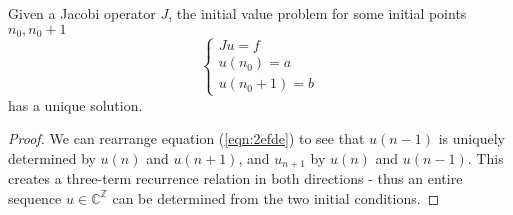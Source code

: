 \documentclass[../main.tex]{subfiles}
\begin{document}
\begin{proposition}\label{thm:2efde-sols}
Given a Jacobi operator $J$, the initial value problem for some initial points $n_0, n_0 + 1$
$$
\begin{cases}
Ju = f\\
u(n_0) = a\\
u(n_0 + 1) = b
\end{cases}
$$
has a unique solution.
\end{proposition}
\begin{proof}
We can rearrange equation (\ref{eqn:2efde}) to see that $u(n-1)$ is uniquely determined by $u(n)$ and $u(n+1)$, and $u_{n+1}$ by $u(n)$ and $u(n-1)$. This creates a three-term recurrence relation in both directions - thus an entire sequence $u \in \mathbb{C}^\mathbb{Z}$ can be determined from the two initial conditions.
\end{proof}
\end{document}

